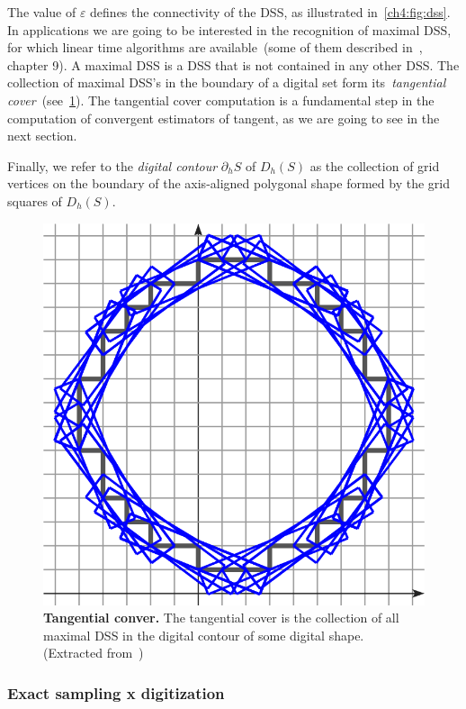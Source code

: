The value of $\varepsilon$ defines the connectivity of the DSS, as illustrated in~\cref{ch4:fig:dss}. In applications we are going to be interested in the recognition of maximal DSS, for which linear time algorithms are available~(some of them described in~\cite{klette04digital}, chapter 9). A maximal DSS is a DSS that is not contained in any other DSS. The collection of maximal DSS's in the boundary of a digital set form its~\emph{tangential cover}~(see~\cref{ch4:fig:tangential-cover}). The tangential cover computation is a fundamental step in the computation of convergent estimators of tangent, as we are going to see in the next section.

Finally, we refer to the \emph{digital contour} $\partial_h S$ of $D_h(S)$ as the collection of grid vertices on the boundary of the axis-aligned polygonal shape formed by the grid squares of $D_h(S)$.

\begin{figure}
\center
\includegraphics[scale=1]{figures/chapter4/dss/tangential-cover.png}
\caption{\textbf{Tangential conver.} The tangential cover is the collection of all maximal DSS in the digital contour of some digital shape. (Extracted from~\cite{})}
\label{ch4:fig:tangential-cover}
\end{figure}


\subsubsection{Exact sampling x digitization}

